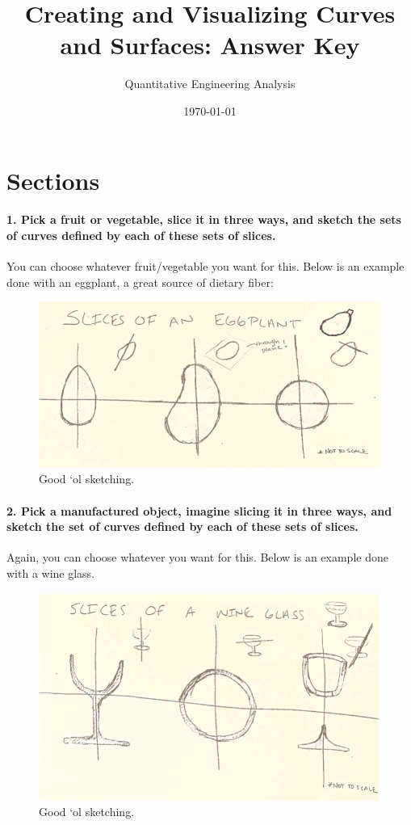 \documentclass{article}
\title{Creating and Visualizing Curves and Surfaces: Answer Key}
\author{Quantitative Engineering Analysis}
\date{\today}
\begin{document}
\maketitle

\section{Sections}

\paragraph{1. Pick a fruit or vegetable, slice it in three ways, and sketch the sets of curves defined by each of these sets of slices.} 

You can choose whatever fruit/vegetable you want for this. Below is an example done with an eggplant, a great source of dietary fiber:

\begin{figure}[h!]
    \centering
    \includegraphics[width=0.55\columnwidth]{figs_and_code/slices_eggplant.jpg}
    \caption{Good `ol sketching.}
\end{figure}

\paragraph{2. Pick a manufactured object, imagine slicing it in three ways, and sketch the set of curves defined by each of these sets of slices.} 

Again, you can choose whatever you want for this. Below is an example done with a wine glass.

\begin{figure}[h!]
    \centering
    \includegraphics[width=0.55\columnwidth]{figs_and_code/slices_wine.jpg}
    \caption{Good `ol sketching.}
\end{figure}
\end{document}
